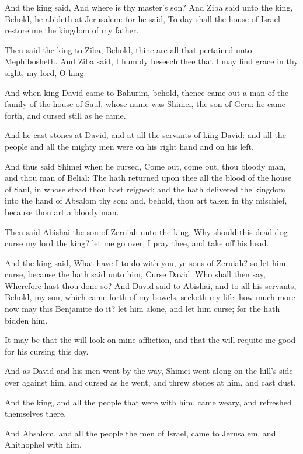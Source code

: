 \Verse And the king said, And where is thy master's son? And Ziba said unto the king, Behold, he abideth at Jerusalem: for he said, To day shall the house of Israel restore me the kingdom of my father.

\Verse Then said the king to Ziba, Behold, thine are all that pertained unto Mephibosheth. And Ziba said, I humbly beseech thee that I may find grace in thy sight, my lord, O king.

\Verse And when king David came to Bahurim, behold, thence came out a man of the family of the house of Saul, whose name was Shimei, the son of Gera: he came forth, and cursed still as he came.

\Verse And he cast stones at David, and at all the servants of king David: and all the people and all the mighty men were on his right hand and on his left.

\Verse And thus said Shimei when he cursed, Come out, come out, thou bloody man, and thou man of Belial: \Verse The \LORD hath returned upon thee all the blood of the house of Saul, in whose stead thou hast reigned; and the \LORD hath delivered the kingdom into the hand of Absalom thy son: and, behold, thou art taken in thy mischief, because thou art a bloody man.

\Verse Then said Abishai the son of Zeruiah unto the king, Why should this dead dog curse my lord the king? let me go over, I pray thee, and take off his head.

\Verse And the king said, What have I to do with you, ye sons of Zeruiah?  so let him curse, because the \LORD hath said unto him, Curse David. Who shall then say, Wherefore hast thou done so?  \Verse And David said to Abishai, and to all his servants, Behold, my son, which came forth of my bowels, seeketh my life: how much more now may this Benjamite do it? let him alone, and let him curse; for the \LORD hath bidden him.

\Verse It may be that the \LORD will look on mine affliction, and that the \LORD will requite me good for his cursing this day.

\Verse And as David and his men went by the way, Shimei went along on the hill's side over against him, and cursed as he went, and threw stones at him, and cast dust.

\Verse And the king, and all the people that were with him, came weary, and refreshed themselves there.

\Verse And Absalom, and all the people the men of Israel, came to Jerusalem, and Ahithophel with him.

